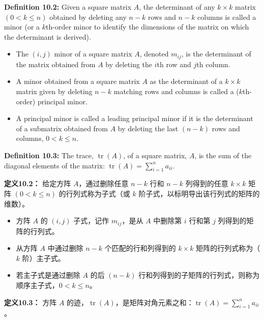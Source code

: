 \begin{original}
\textbf{Definition 10.2:} Given a square matrix $A$, the determinant of any $k \times k$ matrix $(0 < k \leq n)$ obtained by deleting any $n-k$ rows and $n-k$ columns is called a minor (or a $k$th-order minor to identify the dimensions of the matrix on which the determinant is derived).

\begin{itemize}
\item The $(i,j)$ minor of a square matrix $A$, denoted $m_{ij}$, is the determinant of the matrix obtained from $A$ by deleting the $i$th row and $j$th column.
\item A minor obtained from a square matrix $A$ as the determinant of a $k \times k$ matrix given by deleting $n-k$ matching rows and columns is called a ($k$th-order) principal minor.
\item A principal minor is called a leading principal minor if it is the determinant of a submatrix obtained from $A$ by deleting the last $(n-k)$ rows and columns, $0 < k \leq n$.
\end{itemize}

\textbf{Definition 10.3:} The trace, $\operatorname{tr}(A)$, of a square matrix, $A$, is the sum of the diagonal elements of the matrix: $\operatorname{tr}(A) = \sum_{i=1}^n a_{ii}$.
\end{original}
\begin{translation}
\textbf{定义10.2：} 给定方阵 $A$，通过删除任意 $n-k$ 行和 $n-k$ 列得到的任意 $k \times k$ 矩阵 $(0 < k \leq n)$ 的行列式称为子式（或 $k$ 阶子式，以标明导出该行列式的矩阵的维数）。

\begin{itemize}
\item 方阵 $A$ 的 $(i,j)$ 子式，记作 $m_{ij}$，是从 $A$ 中删除第 $i$ 行和第 $j$ 列得到的矩阵的行列式。
\item 从方阵 $A$ 中通过删除 $n-k$ 个匹配的行和列得到的 $k \times k$ 矩阵的行列式称为（$k$ 阶）主子式。
\item 若主子式是通过删除 $A$ 的后 $(n-k)$ 行和列得到的子矩阵的行列式，则称为顺序主子式，$0 < k \leq n$。
\end{itemize}

\textbf{定义10.3：} 方阵 $A$ 的迹，$\operatorname{tr}(A)$，是矩阵对角元素之和：$\operatorname{tr}(A) = \sum_{i=1}^n a_{ii}$。
\end{translation}

